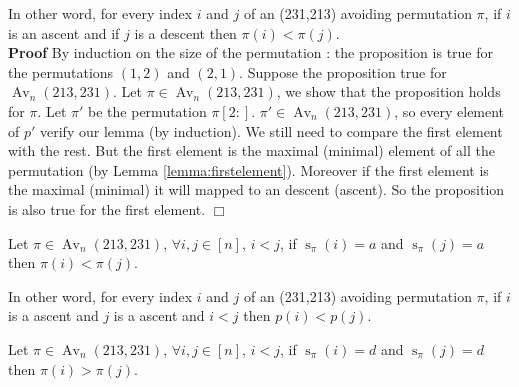 \documentclass[a4paper]{llncs}
\DeclareMathOperator{\Avd}{Av}
\newcommand\Av[2]{\Avd_{{#1}}({#2})}
\DeclareMathOperator{\stripea}{s}
\newcommand{\stripe}[2]{\stripea_{{#1}}({#2})}
\newcommand{\dstep}{d}
\newcommand{\ustep}{a}
\begin{document}
		In other word, for every index $i$ and $j$ of an (231,213) avoiding permutation $\pi$,
		if $i$ is an ascent and
		if $j$ is a descent
		then $\pi(i)<\pi(j)$.\\
		
		\textbf{Proof} By induction on the size of the permutation :
		the proposition is true for the permutations $(1,2)$ and $(2,1)$.
		Suppose the proposition true for $\Av{n}{213,231}$.
		Let $\pi \in \Av{n}{213,231}$, 
		we show that the proposition holds for $\pi$.
		Let $\pi'$ be the permutation $\pi[2:]$.
		$\pi' \in \Av{n}{213,231}$, so
		every element of $p'$ verify our lemma (by induction).
		We still need to compare the first element with the rest.
		But the first element
		is the maximal (minimal) element of all the permutation 
		(by Lemma \ref{lemma:firstelement}).
		Moreover if the first element is the maximal (minimal)
		it will mapped to an descent (ascent).
		So the proposition is also true
		for the first element.
		$\Box$\\

		\begin{lemma}
		\label{lemma:upup}
		Let $\pi \in \Av{n}{213,231}$,
		$\forall i,j \in [n]$, 
		$i<j$, 
		if $\stripe{\pi}{i}=\ustep$
		and $\stripe{\pi}{j}=\ustep$
		then $\pi(i)<\pi(j)$.
		\end{lemma}
		
		In other word, for every index $i$ and $j$ of an (231,213) avoiding permutation $\pi$,
		if $i$ is a ascent
		and $j$ is a ascent
		and $ i<j$
		then $p(i)<p(j)$.\\
		


		\begin{lemma}
		\label{lemma:downdown}
 		Let $\pi \in \Av{n}{213,231}$,
		$\forall i,j \in [n]$,
		$i<j$,
		if $\stripe{\pi}{i}=\dstep$
		and $\stripe{\pi}{j}=\dstep$
		then $\pi(i)>\pi(j)$.
		\end{lemma}
\end{document}
